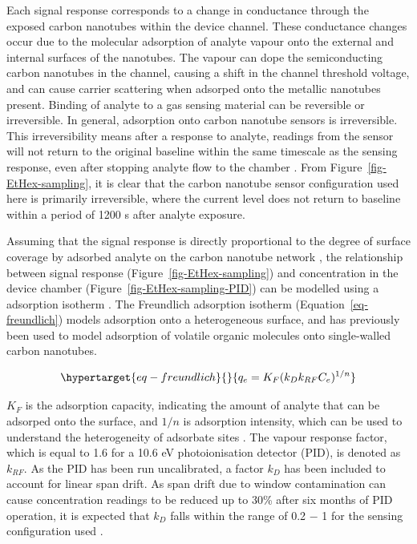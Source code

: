 \documentclass[
  a4paper,
]{scrbook}
\begin{document}
Each signal response corresponds to a change in conductance through the
exposed carbon nanotubes within the device channel. These conductance
changes occur due to the molecular adsorption of analyte vapour onto the
external and internal surfaces of the nanotubes. The vapour can dope the
semiconducting carbon nanotubes in the channel, causing a shift in the
channel threshold voltage, and can cause carrier scattering when
adsorped onto the metallic nanotubes present. Binding of analyte to a
gas sensing material can be reversible or irreversible. In general,
adsorption onto carbon nanotube sensors is irreversible. This
irreversibility means after a response to analyte, readings from the
sensor will not return to the original baseline within the same
timescale as the sensing response, even after stopping analyte flow to
the chamber \autocite{Agnihotri2005,Lee2005}. From
Figure~\ref{fig-EtHex-sampling}, it is clear that the carbon nanotube
sensor configuration used here is primarily irreversible, where the
current level does not return to baseline within a period of 1200 s
after analyte exposure.

Assuming that the signal response is directly proportional to the degree
of surface coverage by adsorbed analyte on the carbon nanotube network
\autocite{Lee2005}, the relationship between signal response
(Figure~\ref{fig-EtHex-sampling}) and concentration in the device
chamber (Figure~\ref{fig-EtHex-sampling-PID}) can be modelled using a
adsorption isotherm \autocite{Agnihotri2005}. The Freundlich adsorption
isotherm (Equation~\ref{eq-freundlich}) models adsorption onto a
heterogeneous surface, and has previously been used to model adsorption
of volatile organic molecules onto single-walled carbon nanotubes.

\begin{equation}\protect\hypertarget{eq-freundlich}{}{
q_e = K_F(k_Dk_{RF}C_e)^{1/n}
}\label{eq-freundlich}\end{equation}

\(K_F\) is the adsorption capacity, indicating the amount of analyte
that can be adsorped onto the surface, and \(1/n\) is adsorption
intensity, which can be used to understand the heterogeneity of
adsorbate sites \autocite{Ayawei2017,Sabzehmeidani2021}. The vapour
response factor, which is equal to 1.6 for a 10.6 eV photoionisation
detector (PID), is denoted as \(k_{RF}\). As the PID has been run
uncalibrated, a factor \(k_{D}\) has been included to account for linear
span drift. As span drift due to window contamination can cause
concentration readings to be reduced up to 30\% after six months of PID
operation, it is expected that \(k_{D}\) falls within the range of 0.2
\(-\) 1 for the sensing configuration used
\autocite{PIDmanual,Ionscience}.
\end{document}
